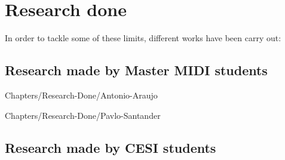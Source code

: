 \chapter{Research done}

In order to tackle some of these limits, different works have been carry out:


\section{Research made by  Master MIDI students}

{Chapters/Research-Done/Antonio-Araujo} 

{Chapters/Research-Done/Pavlo-Santander} 

\section{Research made by CESI students}






